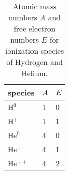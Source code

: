 \begin{table}
\begin{center}
\begin{tabular}{l|ll}
species  & $A$ & $E$ \\
\hline
H$^0$    & 1 & 0 \\
H$^+$    & 1 & 1 \\
He$^0$   & 4 & 0 \\
He$^+$   & 4 & 1 \\
He$^{++}$  & 4 & 2 \\
\end{tabular}
\end{center}
\caption{Atomic mass numbers $A$ and free electron numbers $E$ for ionization species of Hydrogen 
and Helium.}
\label{tab:mass-and-electron-numbers}
\end{table}

